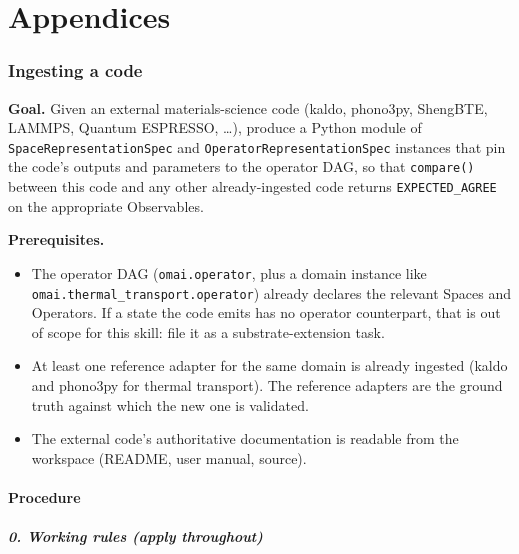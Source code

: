 \documentclass[11pt,a4paper]{article}
\begin{document}
\appendix
\part*{Appendices}

\section{Ingesting a code}
\label{app:ingest}

\noindent\textbf{Goal.} Given an external materials-science code (kaldo,
phono3py, ShengBTE, LAMMPS, Quantum ESPRESSO, \ldots), produce a Python module of
\texttt{SpaceRepresentationSpec} and \texttt{OperatorRepresentationSpec} instances
that pin the code's outputs and parameters to the operator DAG, so that
\texttt{compare()} between this code and any other already-ingested code returns
\texttt{EXPECTED\_AGREE} on the appropriate Observables.

\noindent\textbf{Prerequisites.}
\begin{itemize}[leftmargin=2em]
  \item The operator DAG (\texttt{omai.operator}, plus a domain instance like
        \texttt{omai.thermal\_transport.operator}) already declares the relevant
        Spaces and Operators. If a state the code emits has no operator
        counterpart, that is out of scope for this skill: file it as a
        substrate-extension task.
  \item At least one reference adapter for the same domain is already ingested
        (kaldo and phono3py for thermal transport). The reference adapters are the
        ground truth against which the new one is validated.
  \item The external code's authoritative documentation is readable from the
        workspace (README, user manual, source).
\end{itemize}

\subsection{Procedure}

\subsubsection*{0. Working rules (apply throughout)}
\end{document}
